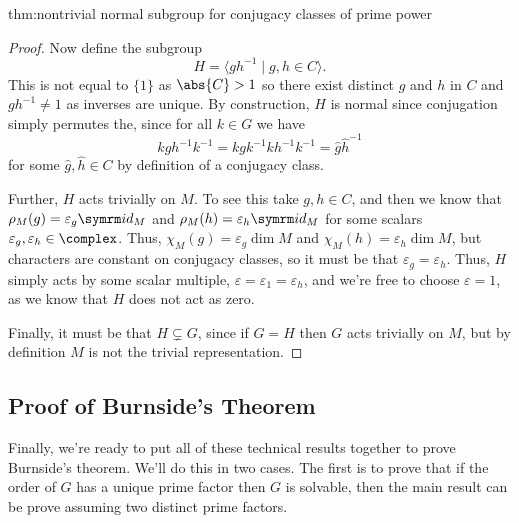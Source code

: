 \begin{thm}{}{thm:nontrivial normal subgroup for conjugacy classes of prime power}
\begin{proof}
        Now define the subgroup
        \begin{equation}
            H = \langle gh^{-1} \mid g, h \in C \rangle.
        \end{equation}
        This is not equal to \(\{1\}\) as \(\abs{C} > 1\) so there exist distinct \(g\) and \(h\) in \(C\) and \(gh^{-1} \ne 1\) as inverses are unique.
        By construction, \(H\) is normal since conjugation simply permutes the, since for all \(k \in G\) we have
        \begin{equation}
            kgh^{-1}k^{-1} = kgk^{-1}kh^{-1}k^{-1} = \hat{g}\hat{h}^{-1}
        \end{equation}
        for some \(\hat{g}, \hat{h} \in C\) by definition of a conjugacy class.
        
        Further, \(H\) acts trivially on \(M\).
        To see this take \(g, h \in C\), and then we know that \(\rho_M(g) = \varepsilon_g \id_M\) and \(\rho_M(h) = \varepsilon_h \id_M\) for some scalars \(\varepsilon_g, \varepsilon_h \in \complex\).
        Thus, \(\chi_M(g) = \varepsilon_g \dim M\) and \(\chi_M(h) = \varepsilon_h \dim M\), but characters are constant on conjugacy classes, so it must be that \(\varepsilon_g = \varepsilon_h\).
        Thus, \(H\) simply acts by some scalar multiple, \(\varepsilon = \varepsilon_1 = \varepsilon_h\), and we're free to choose \(\varepsilon = 1\), as we know that \(H\) does not act as zero.
        
        Finally, it must be that \(H \subsetneq G\), since if \(G = H\) then \(G\) acts trivially on \(M\), but by definition \(M\) is not the trivial representation.
    \end{proof}
\end{thm}

\subsection{Proof of Burnside's Theorem}
Finally, we're ready to put all of these technical results together to prove Burnside's theorem.
We'll do this in two cases.
The first is to prove that if the order of \(G\) has a unique prime factor then \(G\) is solvable, then the main result can be prove assuming two distinct prime factors.

